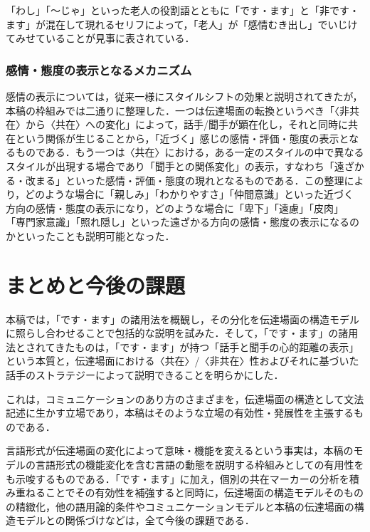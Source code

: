 \documentclass[japanese]{jnlp_1.3c}
\begin{document}
「わし」「〜じゃ」といった老人の役割語とともに「です・ます」と「非です・
ます」が混在して現れるセリフによって，「老人」が「感情むき出し」でいじけ
てみせていることが見事に表されている．

\subsubsection{感情・態度の表示となるメカニズム}

感情の表示については，従来一様にスタイルシフトの効果と説明されてきたが，
本稿の枠組みでは二通りに整理した．一つは伝達場面の転換というべき「〈非共
在〉から〈共在〉への変化」によって，話手/聞手が顕在化し，それと同時に共
在という関係が生じることから，「近づく」感じの感情・評価・態度の表示とな
るものである．もう一つは〈共在〉における，ある一定のスタイルの中で異なる
スタイルが出現する場合であり「聞手との関係変化」の表示，すなわち「遠ざか
る・改まる」といった感情・評価・態度の現れとなるものである．この整理によ
り，どのような場合に「親しみ」「わかりやすさ」「仲間意識」といった近づく
方向の感情・態度の表示になり，どのような場合に「卑下」「遠慮」「皮肉」
「専門家意識」「照れ隠し」といった遠ざかる方向の感情・態度の表示になるの
かといったことも説明可能となった．

\section{まとめと今後の課題}\label{matome}

本稿では，「です・ます」の諸用法を概観し，その分化を伝達場面の構造モデル
に照らし合わせることで包括的な説明を試みた．そして，「です・ます」の諸用
法とされてきたものは，「です・ます」が持つ「話手と聞手の心的距離の表示」
という本質と，伝達場面における〈共在〉/〈非共在〉性およびそれに基づいた
話手のストラテジーによって説明できることを明らかにした．

これは，コミュニケーションのあり方のさまざまを，伝達場面の構造として文法
記述に生かす立場であり，本稿はそのような立場の有効性・発展性を主張するも
のである．

言語形式が伝達場面の変化によって意味・機能を変えるという事実は，本稿のモ
デルの言語形式の機能変化を含む言語の動態を説明する枠組みとしての有用性を
も示唆するものである．「です・ます」に加え，個別の共在マーカーの分析を積
み重ねることでその有効性を補強すると同時に，伝達場面の構造モデルそのもの
の精緻化，他の語用論的条件やコミュニケーションモデルと本稿の伝達場面の構
造モデルとの関係づけなどは，全て今後の課題である．

\acknowledgment
\end{document}
